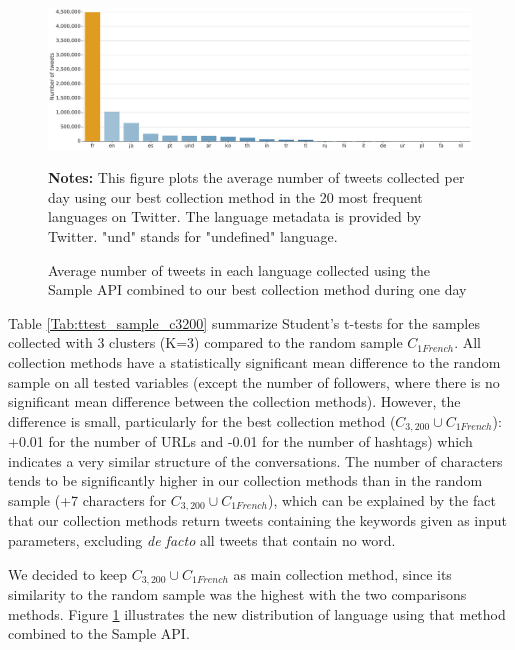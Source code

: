\begin{figure}
\begin{center}
\includegraphics[width=1\textwidth]{figures/HistogramLanguagesFilter.pdf}
\end{center}
\scriptsize \textbf{Notes:} This figure plots the average number of tweets collected per day using our best collection method in the 20 most frequent languages on Twitter. The language metadata is provided by Twitter. "und" stands for "undefined" language.

\caption{Average number of tweets in each language collected using the Sample API combined to our best collection method during one day}
\label{Figure:HistogramLanguagesFilter}
\end{figure}

Table \ref{Tab:ttest_sample_c3200} summarize Student's t-tests for the samples collected with 3 clusters (K=3) compared to the random sample $C_{1French}$. All collection methods have a statistically significant mean difference to the random sample on all tested variables (except the number of followers, where there is no significant mean difference between the collection methods). However, the difference is small, particularly for the best collection method  ($C_{3,200} \cup C_{1French}$): +0.01 for the number of URLs and -0.01 for the number of hashtags) which indicates a very similar structure of the conversations.  The number of characters tends to be significantly higher in our collection methods than in the random sample (+7 characters for $C_{3,200} \cup C_{1French}$), which can be explained by the fact that our collection methods return tweets containing the keywords given as input parameters, excluding \textit{de facto} all tweets that contain no word. 


We decided to keep $C_{3,200} \cup C_{1French}$ as main collection method, since its similarity to the random sample was the highest with the two comparisons methods. Figure \ref{Figure:HistogramLanguagesFilter} illustrates the new distribution of language using that method combined to the Sample API.

